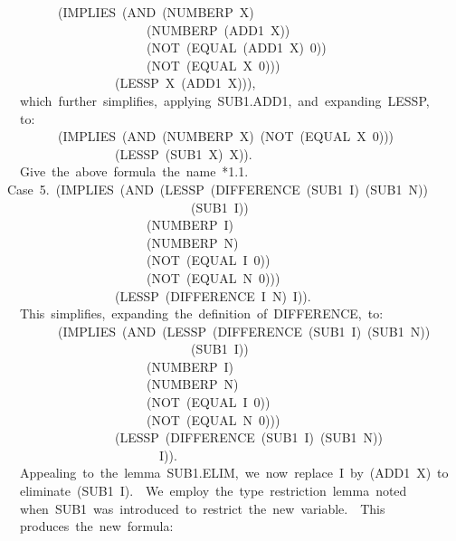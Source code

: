 \documentclass[11pt]{book}
\newenvironment{pubasis}{\begin{flushleft}\ttfamily\small}{\normalsize\rmfamily\end{flushleft}}
\begin{document}
\begin{pubasis}
~~~~~~~~(IMPLIES~(AND~(NUMBERP~X)\\
~~~~~~~~~~~~~~~~~~~~~~(NUMBERP~(ADD1~X))\\
~~~~~~~~~~~~~~~~~~~~~~(NOT~(EQUAL~(ADD1~X)~0))\\
~~~~~~~~~~~~~~~~~~~~~~(NOT~(EQUAL~X~0)))\\
~~~~~~~~~~~~~~~~~(LESSP~X~(ADD1~X))),\\

~~which~further~simplifies,~applying~SUB1.ADD1,~and~expanding~LESSP,\\
~~to:\\

~~~~~~~~(IMPLIES~(AND~(NUMBERP~X)~(NOT~(EQUAL~X~0)))\\
~~~~~~~~~~~~~~~~~(LESSP~(SUB1~X)~X)).\\

~~Give~the~above~formula~the~name~*1.1.\\

Case~5.~(IMPLIES~(AND~(LESSP~(DIFFERENCE~(SUB1~I)~(SUB1~N))\\
~~~~~~~~~~~~~~~~~~~~~~~~~~~~~(SUB1~I))\\
~~~~~~~~~~~~~~~~~~~~~~(NUMBERP~I)\\
~~~~~~~~~~~~~~~~~~~~~~(NUMBERP~N)\\
~~~~~~~~~~~~~~~~~~~~~~(NOT~(EQUAL~I~0))\\
~~~~~~~~~~~~~~~~~~~~~~(NOT~(EQUAL~N~0)))\\
~~~~~~~~~~~~~~~~~(LESSP~(DIFFERENCE~I~N)~I)).\\

~~This~simplifies,~expanding~the~definition~of~DIFFERENCE,~to:\\

~~~~~~~~(IMPLIES~(AND~(LESSP~(DIFFERENCE~(SUB1~I)~(SUB1~N))\\
~~~~~~~~~~~~~~~~~~~~~~~~~~~~~(SUB1~I))\\
~~~~~~~~~~~~~~~~~~~~~~(NUMBERP~I)\\
~~~~~~~~~~~~~~~~~~~~~~(NUMBERP~N)\\
~~~~~~~~~~~~~~~~~~~~~~(NOT~(EQUAL~I~0))\\
~~~~~~~~~~~~~~~~~~~~~~(NOT~(EQUAL~N~0)))\\
~~~~~~~~~~~~~~~~~(LESSP~(DIFFERENCE~(SUB1~I)~(SUB1~N))\\
~~~~~~~~~~~~~~~~~~~~~~~~I)).\\

~~Appealing~to~the~lemma~SUB1.ELIM,~we~now~replace~I~by~(ADD1~X)~to\\
~~eliminate~(SUB1~I).~~We~employ~the~type~restriction~lemma~noted\\
~~when~SUB1~was~introduced~to~restrict~the~new~variable.~~This\\
~~produces~the~new~formula:\\


\end{pubasis}
\end{document}
